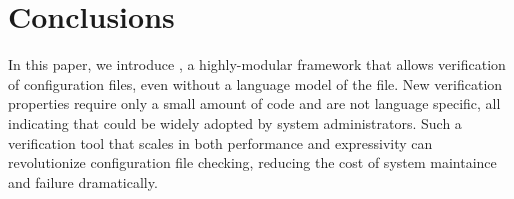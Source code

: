 
\section{Conclusions}

In this paper, we introduce \app, a highly-modular framework that allows verification of configuration files, even without a language model of the file.
New verification properties require only a small amount of code and are not language specific, all indicating that \app could be widely adopted by system administrators.
Such a verification tool that scales in both performance and expressivity can revolutionize configuration file checking, reducing the cost of system maintaince and failure dramatically.
